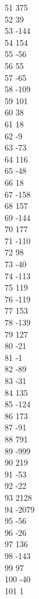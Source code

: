 { 51	375 \\
 52	39 \\
 53	-144 \\
 54	154 \\
 55	-56 \\
 56	55 \\
 57	-65 \\
 58	-109 \\
 59	101 \\
 60	38 \\
 61	18 \\
 62	-9 \\
 63	-73 \\
 64	116 \\
 65	-48 \\
 66	18 \\
 67	-158 \\
 68	157 \\
 69	-144 \\
 70	177 \\
 71	-110 \\
 72	98 \\
 73	-40 \\
 74	-113 \\
 75	119 \\
 76	-119 \\
 77	153 \\
 78	-139 \\
 79	127 \\
 80	-21 \\
 81	-1 \\
 82	-89 \\
 83	-31 \\
 84	135 \\
 85	-124 \\
 86	173 \\
 87	-91 \\
 88	791 \\
 89	-999 \\
 90	219 \\
 91	-53 \\
 92	-22 \\
 93	2128 \\
 94	-2079 \\
 95	-56 \\
 96	-26 \\
 97	136 \\
 98	-143 \\
 99	97 \\
 100	-40 \\
 101	1 \\
}
